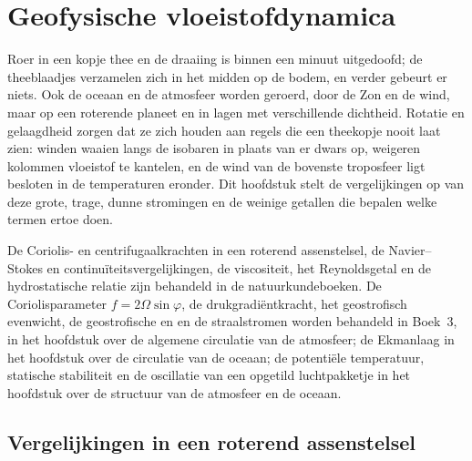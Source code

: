 \chapter{Geofysische vloeistofdynamica}\label{ch:b3:gfd-foundations}

Roer in een kopje thee en de draaiing is binnen een minuut uitgedoofd; de theeblaadjes verzamelen zich in het
midden op de bodem, en verder gebeurt er niets.
Ook de oceaan en de atmosfeer worden geroerd, door de Zon en de wind, maar op een roterende planeet en in
lagen met verschillende dichtheid. Rotatie en gelaagdheid zorgen dat ze zich houden aan
regels die een theekopje nooit laat zien: winden waaien langs de isobaren in plaats van
er dwars op, weigeren kolommen vloeistof te kantelen, en de wind van de bovenste
troposfeer ligt besloten in de temperaturen eronder. Dit hoofdstuk stelt de vergelijkingen op
van deze grote, trage, dunne stromingen en de weinige getallen die
bepalen welke termen ertoe doen.

\begin{recall}
De Coriolis- en centrifugaalkrachten in een roterend assenstelsel, de Navier--Stokes
en continuïteitsvergelijkingen, de viscositeit, het Reynoldsgetal en de hydrostatische
relatie zijn behandeld in de natuurkundeboeken. De Coriolisparameter $f = 2\Omega
\sin\varphi$, de drukgradiëntkracht, het geostrofisch evenwicht, de
geostrofische en  en de straalstromen worden behandeld in Boek~3,
in het hoofdstuk over de algemene circulatie van de atmosfeer; de
Ekmanlaag in het hoofdstuk over de circulatie van de oceaan; de potentiële
temperatuur, statische stabiliteit en de oscillatie van een opgetild luchtpakketje in
het hoofdstuk over de structuur van de atmosfeer en de oceaan.
\end{recall}

\section{Vergelijkingen in een roterend assenstelsel}\label{sec:b3:gfd-foundations:equations}

